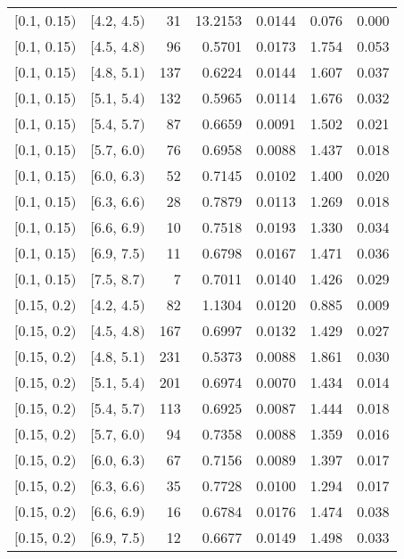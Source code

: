 \begin{longtable}{| l | l | r | r | r | r | r |}
        $[$0.1, 0.15$)$ & $[$4.2, 4.5$)$ & 31  & 13.2153& 0.0144 & 0.076 & 0.000 \\
        $[$0.1, 0.15$)$ & $[$4.5, 4.8$)$ & 96  & 0.5701 & 0.0173 & 1.754 & 0.053 \\
        $[$0.1, 0.15$)$ & $[$4.8, 5.1$)$ & 137 & 0.6224 & 0.0144 & 1.607 & 0.037 \\
        $[$0.1, 0.15$)$ & $[$5.1, 5.4$)$ & 132 & 0.5965 & 0.0114 & 1.676 & 0.032 \\
        $[$0.1, 0.15$)$ & $[$5.4, 5.7$)$ & 87  & 0.6659 & 0.0091 & 1.502 & 0.021 \\
        $[$0.1, 0.15$)$ & $[$5.7, 6.0$)$ & 76  & 0.6958 & 0.0088 & 1.437 & 0.018 \\
        $[$0.1, 0.15$)$ & $[$6.0, 6.3$)$ & 52  & 0.7145 & 0.0102 & 1.400 & 0.020 \\
        $[$0.1, 0.15$)$ & $[$6.3, 6.6$)$ & 28  & 0.7879 & 0.0113 & 1.269 & 0.018 \\
        $[$0.1, 0.15$)$ & $[$6.6, 6.9$)$ & 10  & 0.7518 & 0.0193 & 1.330 & 0.034 \\
        $[$0.1, 0.15$)$ & $[$6.9, 7.5$)$ & 11  & 0.6798 & 0.0167 & 1.471 & 0.036 \\
        $[$0.1, 0.15$)$ & $[$7.5, 8.7$)$ & 7   & 0.7011 & 0.0140 & 1.426 & 0.029 \\
        $[$0.15, 0.2$)$ & $[$4.2, 4.5$)$ & 82  & 1.1304 & 0.0120 & 0.885 & 0.009 \\
        $[$0.15, 0.2$)$ & $[$4.5, 4.8$)$ & 167 & 0.6997 & 0.0132 & 1.429 & 0.027 \\
        $[$0.15, 0.2$)$ & $[$4.8, 5.1$)$ & 231 & 0.5373 & 0.0088 & 1.861 & 0.030 \\
        $[$0.15, 0.2$)$ & $[$5.1, 5.4$)$ & 201 & 0.6974 & 0.0070 & 1.434 & 0.014 \\
        $[$0.15, 0.2$)$ & $[$5.4, 5.7$)$ & 113 & 0.6925 & 0.0087 & 1.444 & 0.018 \\
        $[$0.15, 0.2$)$ & $[$5.7, 6.0$)$ & 94  & 0.7358 & 0.0088 & 1.359 & 0.016 \\
        $[$0.15, 0.2$)$ & $[$6.0, 6.3$)$ & 67  & 0.7156 & 0.0089 & 1.397 & 0.017 \\
        $[$0.15, 0.2$)$ & $[$6.3, 6.6$)$ & 35  & 0.7728 & 0.0100 & 1.294 & 0.017 \\
        $[$0.15, 0.2$)$ & $[$6.6, 6.9$)$ & 16  & 0.6784 & 0.0176 & 1.474 & 0.038 \\
        $[$0.15, 0.2$)$ & $[$6.9, 7.5$)$ & 12  & 0.6677 & 0.0149 & 1.498 & 0.033 \\

\end{longtable}
